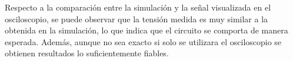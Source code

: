     \sangria{} Respecto a la comparación entre la simulación y la señal visualizada en el osciloscopio, se puede observar que la tensión medida es muy similar a la obtenida en la simulación, lo que indica que el circuito se comporta de manera esperada. Además, aunque no sea exacto si solo se utilizara el osciloscopio se obtienen resultados lo suficientemente fiables. \\




